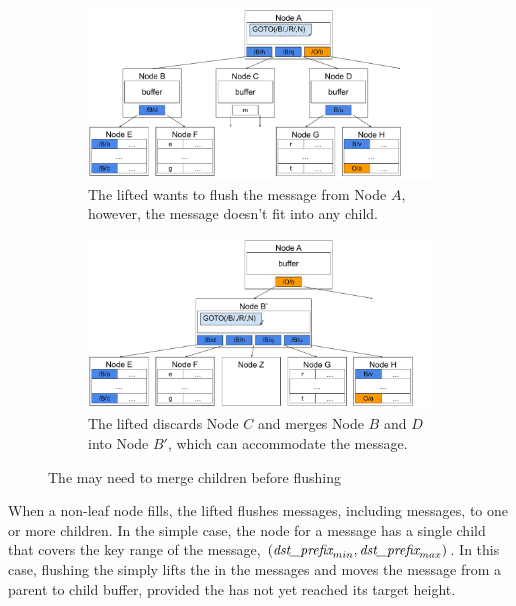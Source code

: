 \begin{figure}
    \begin{subfigure}{\textwidth}
        \centering
        \includegraphics[width=.9\linewidth]{fig/flush-1}
        \caption{\label{subfig:flush-1} The lifted \bedag wants to flush the
            \goto message from Node $A$, however, the \goto message doesn't
            fit into any child.}
    \end{subfigure}
    \begin{subfigure}{\textwidth}
        \centering
        \includegraphics[width=.9\linewidth]{fig/flush-2}
        \caption{\label{subfig:flush-2} The lifted \bedag discards Node $C$ and
            merges Node $B$ and $D$ into Node $B'$, which can accommodate the
            \goto message.}
    \end{subfigure}
    \caption[An example of flushing \goto messages merges children]{\label{fig:flush}
        The \bedag may need to merge children before flushing}
\end{figure}

When a non-leaf node fills, the lifted \bedag flushes messages, including \goto
messages, to one or more children.
In the simple case, the node for a \goto message has a single child that covers
the key range of the \goto message, $(\textit{dst\_prefix}_{min}, \textit{dst\_prefix}_{max})$.
In this case, flushing the \goto simply lifts the \dpre in the messages and
moves the message from a parent to child buffer,
provided the \goto has not yet reached its target height.

